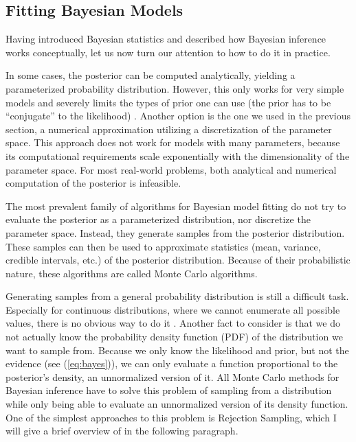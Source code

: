 \documentclass[12pt, a4paper]{report}
\begin{document}
\subsection{Fitting Bayesian Models}
Having introduced Bayesian statistics and described how Bayesian inference works conceptually, let us now turn our attention to how to do it in practice.

In some cases, the posterior can be computed analytically, yielding a parameterized probability distribution.
However, this only works for very simple models and severely limits the types of prior one can use (the prior has to be ``conjugate'' to the likelihood) \cite[39]{mcelreath}.
Another option is the one we used in the previous section, a numerical approximation utilizing a discretization of the parameter space.
This approach does not work for models with many parameters, because its computational requirements scale exponentially with the dimensionality of the parameter space.
For most real-world problems, both analytical and numerical computation of the posterior is infeasible.

The most prevalent family of algorithms for Bayesian model fitting do not try to evaluate the posterior as a parameterized distribution, nor discretize the parameter space.
Instead, they generate samples from the posterior distribution.
These samples can then be used to approximate statistics (mean, variance, credible intervals, etc.) of the posterior distribution.
Because of their probabilistic nature, these algorithms are called Monte Carlo algorithms.

Generating samples from a general probability distribution is still a difficult task.
Especially for continuous distributions, where we cannot enumerate all possible values, there is no obvious way to do it \cite[358]{mckay}.
Another fact to consider is that we do not actually know the probability density function (PDF) of the distribution we want to sample from.
Because we only know the likelihood and prior, but not the evidence (see (\ref{eq:bayes})), we can only evaluate a function proportional to the posterior's density, an unnormalized version of it.
All Monte Carlo methods for Bayesian inference have to solve this problem of sampling from a distribution while only being able to evaluate an unnormalized version of its density function.
One of the simplest approaches to this problem is Rejection Sampling, which I will give a brief overview of in the following paragraph.
\end{document}
